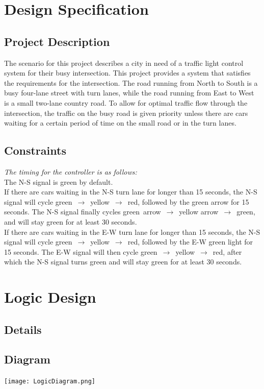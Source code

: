 \section{Design Specification}
\subsection{Project Description}
The scenario for this project describes a city in need of a traffic light control system for their busy intersection.
This project provides a system that satisfies the requirements for the intersection. The road running from North to South is a busy four-lane street with turn lanes,
while the road running from East to West is a small two-lane country road. To allow for optimal traffic flow through the intersection,
the traffic on the busy road is given priority unless there are cars waiting for a certain period of time on the small road or in the turn lanes.

\subsection{Constraints}
\emph{The timing for the controller is as follows:}\\[5mm]
The N-S signal is green by default.\\[5mm]
If there are cars waiting in the N-S turn lane for longer than 15 seconds, the N-S signal will cycle green~$\rightarrow$~yellow~$\rightarrow$~red, followed by the green arrow for 15 seconds.
The N-S signal finally cycles green~arrow~$\rightarrow$~yellow arrow~$\rightarrow$~green, and will stay green for at least 30 seconds.\\[5mm]
If there are cars waiting in the E-W turn lane for longer than 15 seconds, the N-S signal will cycle green~$\rightarrow$~yellow~$\rightarrow$~red, followed by the E-W green light for 15 seconds.
The E-W signal will then cycle green~$\rightarrow$~yellow~$\rightarrow$~red, after which the N-S signal turns green and will stay green for at least 30 seconds.

\section{Logic Design}
\subsection{Details}
\subsection{Diagram}
\texttt{[image: LogicDiagram.png]}

